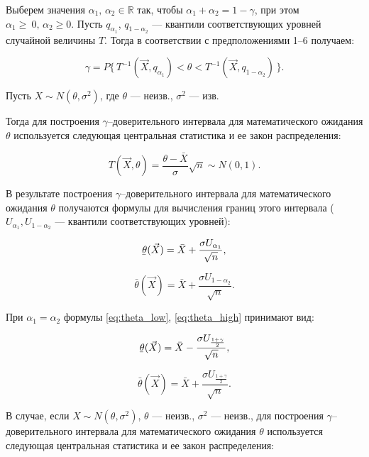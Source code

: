 Выберем значения $\alpha_1, \, \alpha_2 \in \mathbb{R}$ так, чтобы $\alpha_1 + \alpha_2 = 1 - \gamma$, при этом $\alpha_1 \geq~0, \, \alpha_2 \geq 0$.
Пусть $q_{\alpha_1}$, $q_{1 - \alpha_2}$ --- квантили соответствующих уровней случайной величины $T$.
Тогда в соответствии с предположениями 1--6 получаем: 

\begin{equation}
	\gamma = P\{ \, T^{-1}(\vec{X}, q_{\alpha_1}) < \theta < T^{-1}(\vec{X}, q_{1 - \alpha_2}) \, \}.
\end{equation}

Пусть $X \sim N(\theta, \sigma^2)$, где $\theta$ --- неизв., $\sigma^2$ --- изв.

Тогда для построения $\gamma$--доверительного интервала для математического ожидания $\theta$ используется следующая центральная статистика и ее закон распределения:

\begin{equation}
	T(\vec{X}, \theta) = \frac{\theta - \bar{X}}{\sigma}\sqrt{n} \sim N(0, 1).
\end{equation}

В результате построения $\gamma$--доверительного интервала для математического ожидания $\theta$ получаются формулы для вычисления границ этого интервала ($U_{\alpha_1}, U_{1 - \alpha_2}$ --- квантили соответствующих уровней):

\begin{equation}\label{eq:theta_low}
	\ubar{\theta}(\vec{X}) = \bar{X} + \frac{\sigma U_{\alpha_1}}{\sqrt{n}},
\end{equation}

\begin{equation}\label{eq:theta_high}
	\bar{\theta}(\vec{X}) = \bar{X} + \frac{\sigma U_{1 - \alpha_2}}{\sqrt{n}}.
\end{equation}

При $\alpha_1 = \alpha_2$ формулы \ref{eq:theta_low}, \ref{eq:theta_high} принимают вид:

\begin{equation}
	\ubar{\theta}(\vec{X}) = \bar{X} - \frac{\sigma U_{ \frac{1 + \gamma}{2} } }{ \sqrt{n} },
\end{equation}

\begin{equation}
	\bar{\theta}(\vec{X}) = \bar{X} + \frac{\sigma U_{ \frac{1 + \gamma}{2} } }{ \sqrt{n} }.
\end{equation}

В случае, если $X \sim N(\theta, \sigma^2)$, $\theta$ --- неизв., $\sigma^2$ --- неизв., для построения $\gamma$--доверительного интервала для математического ожидания $\theta$ используется следующая центральная статистика и ее закон распределения:

